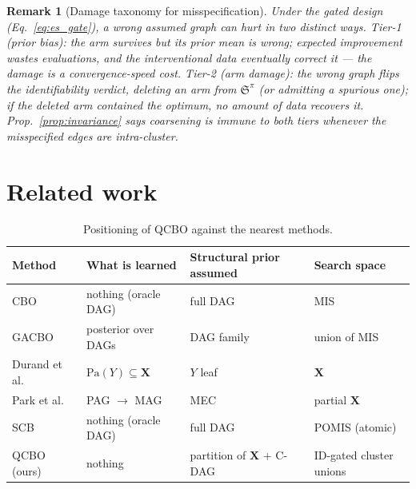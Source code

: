 \documentclass{article}
\newtheorem{remark}{Remark}
\newcommand{\Pa}{\mathrm{Pa}}
\newcommand{\QCBO}{\textsc{QCBO}}
\newcommand{\ESpi}{\mathfrak{S}^{\pi}}
\begin{document}
\begin{remark}[Damage taxonomy for misspecification]
\label{rem:taxonomy}
Under the gated design (Eq.~\ref{eq:es_gate}), a wrong assumed graph can
hurt in two distinct ways. \emph{Tier-1 (prior bias):} the arm survives
but its prior mean is wrong; expected improvement wastes evaluations, and
the interventional data eventually correct it --- the damage is a
convergence-speed cost. \emph{Tier-2 (arm damage):} the wrong graph flips
the identifiability verdict, deleting an arm from $\ESpi$ (or admitting a
spurious one); if the deleted arm contained the optimum, no amount of data
recovers it. Prop.~\ref{prop:invariance} says coarsening is immune to both
tiers whenever the misspecified edges are intra-cluster.
\end{remark}


\section{Related work}
\label{sec:related}

\begin{table}[t]
  \centering
  \caption{Positioning of \QCBO{} against the nearest methods.}
  \label{tab:related}
  \vspace{4pt}
  \small
  \begin{tabular}{@{}llll@{}}
    \toprule
    \textbf{Method} & \textbf{What is learned} & \textbf{Structural prior assumed} & \textbf{Search space} \\
    \midrule
    CBO~\citep{aglietti2020causal}    & nothing (oracle DAG) & full DAG & MIS \\
    GACBO~\citep{mukherjee2024gacbo}  & posterior over DAGs & DAG family & union of MIS \\
    Durand et al.~\citep{durand2025unknown} & $\Pa(Y) \subseteq \mathbf{X}$ & $Y$ leaf & $\mathbf{X}$ \\
    Park et al.~\citep{park2025dmis} & PAG $\to$ MAG & MEC & partial $\mathbf{X}$ \\
    SCB~\citep{lee2018structural}     & nothing (oracle DAG) & full DAG & POMIS (atomic) \\
    \midrule
    \QCBO{} (ours) & nothing & partition of $\mathbf{X}$ + C-DAG & ID-gated cluster unions \\
    \bottomrule
  \end{tabular}
\end{table}
\end{document}
